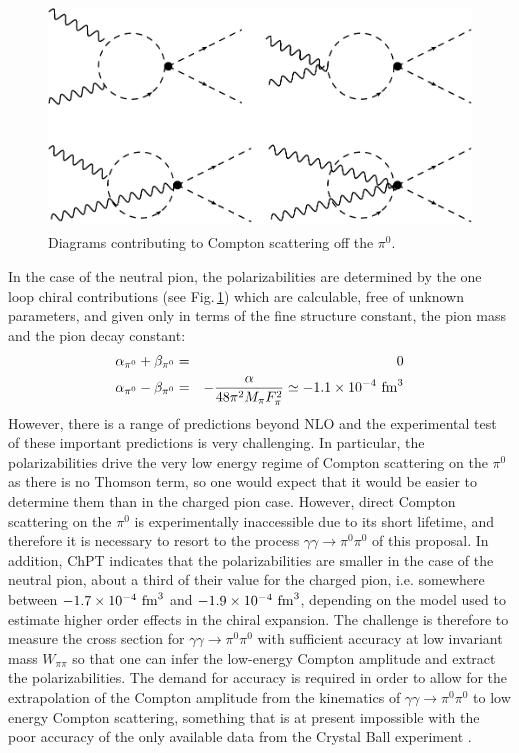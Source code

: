 \begin{figure}[h]
\begin{center}
\includegraphics[height=6cm,angle=0]{figures/DiagramsChPT.pdf}
\end{center}
\caption{Diagrams contributing to Compton scattering off the $\pi^0$.
\label{fig:digrams}}
\end{figure}


In the case of the neutral pion, the polarizabilities are determined
by the one loop chiral contributions (see Fig.\,\ref{fig:digrams})
which are calculable, free of unknown parameters, and given only in
terms of the fine structure constant, the pion mass and the pion decay
constant:
\begin{eqnarray}
\alpha_{\pi^0}+\beta_{\pi^0}&=&0\nonumber\\
\alpha_{\pi^0}-\beta_{\pi^0}&=&-\frac{\alpha}{48 \pi^2 M_\pi F_\pi^2}\simeq -1.1\times 10^{-4}~{\rm fm}^3
\end{eqnarray}
However, there is a range of predictions beyond
NLO and the experimental test of these important predictions is very
challenging. In particular, the polarizabilities drive the very
low energy regime of Compton scattering on the $\pi^0$ as there is no
Thomson term, so one would expect that it would be easier to determine
them than in the charged pion case.  However, direct
Compton scattering on the $\pi^0$ is experimentally inaccessible due
to its short lifetime, and therefore it is necessary to resort to the
process $\gamma\gamma\to \pi^0\pi^0$ of this proposal. In addition, ChPT
indicates that the
polarizabilities are smaller in the case of the neutral pion, about a
third of their value for the charged pion, i.e. somewhere between
$-1.7\times 10^{-4}~{\rm fm}^3$ and $-1.9\times 10^{-4}~{\rm fm}^3$,
depending on the model used to estimate higher order effects in the chiral
expansion. The challenge is therefore to measure the
cross section for $\gamma\gamma \to \pi^0\pi^0$ with sufficient
accuracy at low invariant mass $W_{\pi\pi}$ so that one can infer the
low-energy Compton amplitude and extract the polarizabilities. The demand for
accuracy is required in order to allow for the extrapolation of the Compton
amplitude from the kinematics of $\gamma\gamma \to \pi^0\pi^0$ to   low energy
Compton scattering, something that is at present impossible with the poor
accuracy of the only available data from the Crystal Ball experiment \cite{Marsiske:1990hx}.
 


